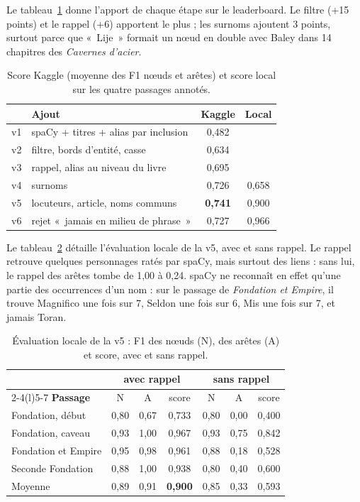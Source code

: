 \documentclass[cameraready]{Interspeech}
\begin{document}
Le tableau~\ref{tab:kaggle} donne l'apport de chaque étape sur le leaderboard. Le filtre (+15 points) et le
rappel (+6) apportent le plus ; les surnoms ajoutent 3 points, surtout parce que «~Lije~» formait un nœud en
double avec Baley dans 14 chapitres des \emph{Cavernes d'acier}.

\begin{table}[t]
  \caption{Score Kaggle (moyenne des F1 nœuds et arêtes) et score local sur les quatre passages annotés.}
  \label{tab:kaggle}
  \centering
  \begin{tabular}{@{}llcc@{}}
    \toprule
    & \textbf{Ajout} & \textbf{Kaggle} & \textbf{Local} \\
    \midrule
    v1 & spaCy + titres + alias par inclusion & 0,482 & \\
    v2 & filtre, bords d'entité, casse & 0,634 & \\
    v3 & rappel, alias au niveau du livre & 0,695 & \\
    v4 & surnoms & 0,726 & 0,658 \\
    v5 & locuteurs, article, noms communs & \textbf{0,741} & 0,900 \\
    v6 & rejet «~jamais en milieu de phrase~» & 0,727 & 0,966 \\
    \bottomrule
  \end{tabular}
\end{table}

Le tableau~\ref{tab:local} détaille l'évaluation locale de la v5, avec et sans rappel. Le rappel retrouve
quelques personnages ratés par spaCy, mais surtout des liens : sans lui, le rappel des arêtes tombe de 1,00 à
0,24. spaCy ne reconnaît en effet qu'une partie des occurrences d'un nom : sur le passage de \emph{Fondation et
Empire}, il trouve Magnifico une fois sur 7, Seldon une fois sur 6, Mis une fois sur 7, et jamais Toran.

\begin{table}[t]
  \caption{Évaluation locale de la v5 : F1 des nœuds (N), des arêtes (A) et score, avec et sans rappel.}
  \label{tab:local}
  \centering
  \begin{tabular}{@{}lcccccc@{}}
    \toprule
    & \multicolumn{3}{c}{\textbf{avec rappel}} & \multicolumn{3}{c}{\textbf{sans rappel}} \\
    \cmidrule(lr){2-4}\cmidrule(l){5-7}
    \textbf{Passage} & N & A & score & N & A & score \\
    \midrule
    Fondation, début & 0,80 & 0,67 & 0,733 & 0,80 & 0,00 & 0,400 \\
    Fondation, caveau & 0,93 & 1,00 & 0,967 & 0,93 & 0,75 & 0,842 \\
    Fondation et Empire & 0,95 & 0,98 & 0,961 & 0,88 & 0,18 & 0,528 \\
    Seconde Fondation & 0,88 & 1,00 & 0,938 & 0,80 & 0,40 & 0,600 \\
    \midrule
    Moyenne & 0,89 & 0,91 & \textbf{0,900} & 0,85 & 0,33 & 0,593 \\
    \bottomrule
  \end{tabular}
\end{table}
\end{document}

